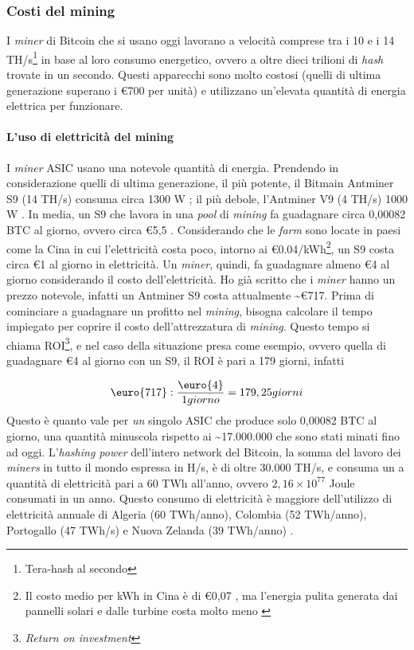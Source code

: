 \documentclass {article}
\begin{document}
\subsubsection {Costi del mining}

I \textit{miner} di Bitcoin che si usano oggi lavorano a velocità comprese tra i 10 e i 14 TH/s\footnote{Tera-hash al secondo} in base al loro consumo energetico, ovvero a oltre dieci trilioni di \textit{hash} trovate in un secondo.
Questi apparecchi sono molto costosi (quelli di ultima generazione superano i \euro{700} per unità) e utilizzano un'elevata quantità di energia elettrica per funzionare.

\paragraph {L'uso di elettricità del mining}

I \textit{miner} ASIC usano una notevole quantità di energia. Prendendo in considerazione quelli di ultima generazione, il più potente, il Bitmain Antminer S9 (14 TH/s) consuma circa 1300 W \cite{antminers9}; il più debole, l'Antminer V9 (4 TH/s) 1000 W \cite{antminerv9}.
In media, un S9 che lavora in una \textit{pool} di \textit{mining} fa guadagnare circa 0,00082 BTC al giorno, ovvero circa \euro{5,5} \cite{s9profit}.
Considerando che le \textit{farm} sono locate in paesi come la Cina in cui l'elettricità costa poco, intorno ai \euro{0.04}/kWh\footnote{Il costo medio per kWh in Cina è di \euro{0,07} \cite{chinaaverage}, ma l'energia pulita generata dai pannelli solari e dalle turbine costa molto meno \cite{chinaless}}, un S9 costa circa \euro{1} al giorno in elettricità.
Un \textit{miner}, quindi, fa guadagnare almeno \euro{4} al giorno considerando il costo dell'elettricità.
Ho già scritto che i \textit{miner} hanno un prezzo notevole, infatti un Antminer S9 costa attualmente \textasciitilde \euro{717}.
Prima di cominciare a guadagnare un profitto nel \textit{mining}, bisogna calcolare il tempo impiegato per coprire il costo dell'attrezzatura di \textit{mining}.
Questo tempo si chiama ROI\footnote{\textit{Return on investment}}, e nel caso della situazione presa come esempio, ovvero quella di guadagnare \euro{4} al giorno con un S9, il ROI è pari a 179 giorni, infatti

$$\textup{\euro{717}} : \frac{\textup{\euro{4}}}{1 giorno} = 179,25 giorni$$
%
Questo è quanto vale per \emph{un} singolo ASIC che produce solo 0,00082 BTC al giorno, una quantità minuscola rispetto ai \textasciitilde 17.000.000 che sono stati minati fino ad oggi.
L'\textit{hashing power} dell'intero network del Bitcoin, la somma del lavoro dei \textit{miners} in tutto il mondo espressa in H/s, è di oltre 30.000 TH/s, e consuma un a quantità di elettricità pari a 60 TWh all'anno, ovvero $2,16 \times 10^{77}$ Joule consumati in un anno.
Questo consumo di elettricità è maggiore dell'utilizzo di elettricità annuale di Algeria (60 TWh/anno), Colombia (52 TWh/anno), Portogallo (47 TWh/s) e Nuova Zelanda (39 TWh/anno) \cite{worldenergy}.
\end{document}
